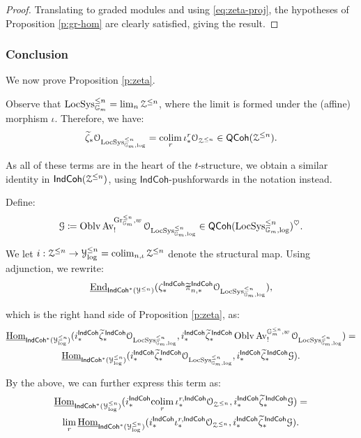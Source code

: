\documentclass[reqno,11pt]{amsart}
\numberwithin{equation}{subsection}
\theoremstyle{remark}
\newcommand{\bG}{{\mathbb G}}
\newcommand{\sG}{{\EuScript G}}
\newcommand{\sO}{{\EuScript O}}
\newcommand{\sY}{{\EuScript Y}}
\newcommand{\sZ}{{\EuScript Z}}
\newcommand{\on}{\operatorname}
\newcommand{\ul}{\underline}
\newcommand{\End}{\on{End}}
\newcommand{\Hom}{\on{Hom}}
\newcommand{\Gr}{\on{Gr}}
\newcommand{\LocSys}{\on{LocSys}}
\newcommand{\colim}{\on{colim}}
\renewcommand{\lim}{\on{lim}}
\newcommand{\heart}{\heartsuit}
\newcommand{\Oblv}{\on{Oblv}}
\newcommand{\Av}{\on{Av}}
\newcommand{\IndCoh}{\mathsf{IndCoh}}
\newcommand{\QCoh}{\mathsf{QCoh}}
\begin{document}
\begin{proof}

Translating to graded modules and using \eqref{eq:zeta-proj},
the hypotheses of Proposition \ref{p:gr-hom} are clearly satisfied, giving the result.
	
\end{proof}

\subsubsection{Conclusion}\label{ss:zeta-pf}

We now prove Proposition \ref{p:zeta}.

Observe that $\LocSys_{\bG_m}^{\leq n} = \lim_n \sZ^{\leq n}$, where the limit
is formed under the (affine) morphism $\iota$. Therefore, we have:
%
\[
\widetilde{\zeta}_*\sO_{\LocSys_{\bG_m,\log}^{\leq n}} = 
\underset{r}{\colim} \, \iota_*^r \sO_{\sZ^{\leq n}} \in \QCoh(\sZ^{\leq n}).
\]

\noindent As all of these terms are in the heart of the $t$-structure, 
we obtain a similar identity in $\IndCoh(\sZ^{\leq n})$, using $\IndCoh$-pushforwards 
in the notation instead.

Define:
%
\[
\sG \coloneqq \Oblv\Av_!^{\Gr_{\bG_m}^{\leq n},w}
\sO_{\LocSys_{\bG_m,\log}^{\leq n}} \in 
\QCoh(\LocSys_{\bG_m,\log}^{\leq n})^{\heart}.
\]

We let $i:\sZ^{\leq n} \to \sY_{\log}^{\leq n} = \colim_{n,\iota} \sZ^{\leq n}$ 
denote the structural map. Using adjunction, we rewrite:
%
\begin{equation}\label{eq:zeta-rhs}
\ul{\End}_{\IndCoh^*(\sY^{\leq n})}
(\zeta_*^{\IndCoh}\widetilde{\pi}_{n,*}^{\IndCoh}
\sO_{\LocSys_{\bG_m,\log}^{\leq n}}),
\end{equation}

\noindent which is the right hand side of Proposition \ref{p:zeta}, as:
%
\[
\begin{gathered}
\ul{\Hom}_{\IndCoh^*(\sY_{\log}^{\leq n})}
(i_*^{\IndCoh}\widetilde{\zeta}_*^{\,\IndCoh}\sO_{\LocSys_{\bG_m,\log}^{\leq n}},
i_*^{\IndCoh}\widetilde{\zeta}_*^{\,\IndCoh}\Oblv\Av_!^{\bG_m^{\leq n},w}\sO_{\LocSys_{\bG_m,\log}^{\leq n}}) = \\
\ul{\Hom}_{\IndCoh^*(\sY_{\log}^{\leq n})}
(i_*^{\IndCoh}\widetilde{\zeta}_*^{\,\IndCoh}\sO_{\LocSys_{\bG_m,\log}^{\leq n}},
i_*^{\IndCoh}\widetilde{\zeta}_*^{\,\IndCoh}\sG). 
\end{gathered}
\]

\noindent By the above, we can further express this term as:
%
\[
\begin{gathered}
\ul{\Hom}_{\IndCoh^*(\sY_{\log}^{\leq n})}
(i_*^{\IndCoh}\underset{r}{\colim} \, \iota_*^{r,\IndCoh} \sO_{\sZ^{\leq n}},
i_*^{\IndCoh}\widetilde{\zeta}_*^{\,\IndCoh}\sG) = \\
\underset{r}{\lim} \, \ul{\Hom}_{\IndCoh^*(\sY_{\log}^{\leq n})}
(i_*^{\IndCoh} \iota_*^{r,\IndCoh} \sO_{\sZ^{\leq n}},
i_*^{\IndCoh}\widetilde{\zeta}_*^{\,\IndCoh}\sG).
\end{gathered}
\]
\end{document}
